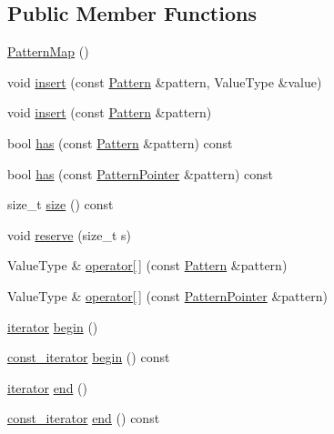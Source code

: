 \subsection*{Public Member Functions}
\begin{DoxyCompactItemize}
\item 
\hyperlink{classPatternMap_af59f2ae4994cc927580751644b00bef0}{Pattern\+Map} ()
\item 
void \hyperlink{classPatternMap_a67628e669cf2995a44769cda83bf8e85}{insert} (const \hyperlink{classPattern}{Pattern} \&pattern, Value\+Type \&value)
\item 
void \hyperlink{classPatternMap_a911511a1b32cef2ee3efb234f66974ce}{insert} (const \hyperlink{classPattern}{Pattern} \&pattern)
\item 
bool \hyperlink{classPatternMap_a038d49e8aed58a207c3e106b086cdab0}{has} (const \hyperlink{classPattern}{Pattern} \&pattern) const 
\item 
bool \hyperlink{classPatternMap_a18587e4b3c6143749b4b96e8f4808cdb}{has} (const \hyperlink{classPatternPointer}{Pattern\+Pointer} \&pattern) const 
\item 
size\+\_\+t \hyperlink{classPatternMap_aed30070f31256d0c1335fa9bd3b5db1c}{size} () const 
\item 
void \hyperlink{classPatternMap_af3718a607f4d34f656b3b8aaf8e52494}{reserve} (size\+\_\+t s)
\item 
Value\+Type \& \hyperlink{classPatternMap_af08cad16a81aede5cf12f9601b75d697}{operator\mbox{[}$\,$\mbox{]}} (const \hyperlink{classPattern}{Pattern} \&pattern)
\item 
Value\+Type \& \hyperlink{classPatternMap_a790d9a4673f3971c644b120660bfab22}{operator\mbox{[}$\,$\mbox{]}} (const \hyperlink{classPatternPointer}{Pattern\+Pointer} \&pattern)
\item 
\hyperlink{classPatternMap_a4de5ceaff3526d091098b4d82dde2b27}{iterator} \hyperlink{classPatternMap_a6e536f5947c4e1752f91166922c4ae16}{begin} ()
\item 
\hyperlink{classPatternMap_aba8ff62eadadedc25bf4ea799a322cf3}{const\+\_\+iterator} \hyperlink{classPatternMap_addb90b8e3f3721f061757bb5cec64bf2}{begin} () const 
\item 
\hyperlink{classPatternMap_a4de5ceaff3526d091098b4d82dde2b27}{iterator} \hyperlink{classPatternMap_aa5a92eab727e74e54b93f7f7916e26cb}{end} ()
\item 
\hyperlink{classPatternMap_aba8ff62eadadedc25bf4ea799a322cf3}{const\+\_\+iterator} \hyperlink{classPatternMap_a75f67f68fb66a7d15d7f8c75cb08dc8d}{end} () const 

\end{DoxyCompactItemize}
